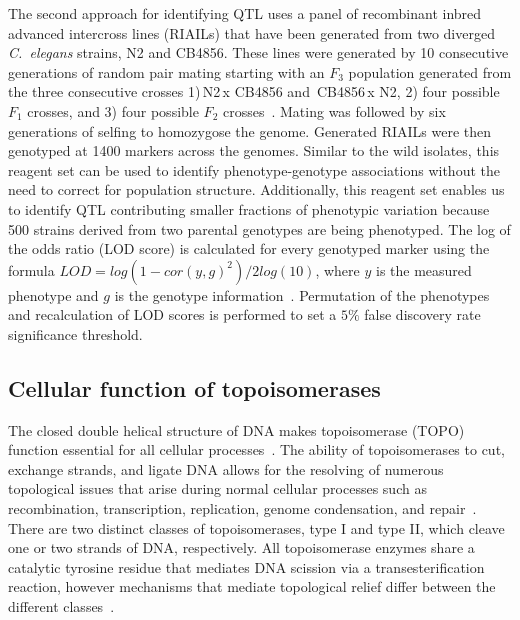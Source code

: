 \documentclass[12pt]{article}
\begin{document}
The second approach for identifying QTL uses a panel of recombinant inbred advanced intercross lines (RIAILs) that have been generated from two diverged {\it C.~elegans} strains, N2 and CB4856. These lines were generated by 10 consecutive generations of random pair mating starting with an $F_{3}$ population generated from the three consecutive crosses 1)\,\Male N2\,x\,\Hermaphrodite\,CB4856 and \Male\,CB4856\,x\,\Hermaphrodite\,N2, 2) four possible $F_{1}$ crosses, and 3) four possible $F_{2}$ crosses~\cite{Rockman:2009hb,Andersen:2015dm,Rockman:2008db}. Mating was followed by six generations of selfing to homozygose the genome. Generated RIAILs were then genotyped at 1400 markers across the genomes. Similar to the wild isolates, this reagent set can be used to identify phenotype-genotype associations without the need to correct for population structure. Additionally, this reagent set enables us to identify QTL contributing smaller fractions of phenotypic variation because 500 strains derived from two parental genotypes are being phenotyped. The log of the odds ratio (LOD score) is calculated for every genotyped marker using the formula $LOD = log(1-cor(y,g)^2)/2log(10)$, where $y$ is the measured phenotype and $g$ is the genotype information~\cite{Lander:1995js,Kruglyak:1996uy}. Permutation of the phenotypes and recalculation of LOD scores is performed to set a $5\%$ false discovery rate significance threshold.

\vspace{-5pt}
\subsection{Cellular function of topoisomerases}\label{topos}

The closed double helical structure of DNA makes topoisomerase (TOPO) function essential for all cellular processes~\cite{Champoux:2001cc}. The ability of topoisomerases to cut, exchange strands, and ligate DNA allows for the resolving of numerous topological issues that arise during normal cellular processes such as recombination, transcription, replication, genome condensation, and repair~\cite{Wang:2002hh}. There are two distinct classes of topoisomerases, type I and type II, which cleave one or two strands of DNA, respectively. All topoisomerase enzymes share a catalytic tyrosine residue that mediates DNA scission via a transesterification reaction, however mechanisms that mediate topological relief differ between the different classes~\cite{Vos:2011cra}. 
\vspace{-25pt}
\end{document}
